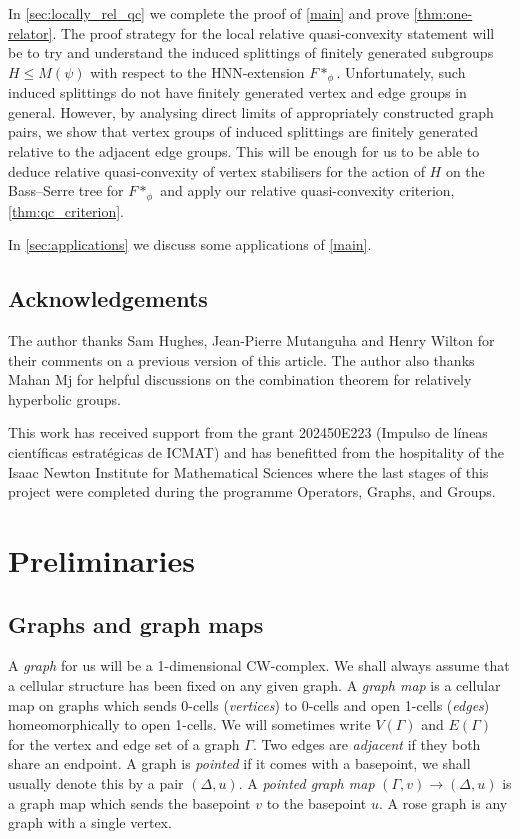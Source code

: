 \documentclass[11pt, a4paper]{amsart}
\theoremstyle{definition}
\begin{document}
In \cref{sec:locally_rel_qc} we complete the proof of \cref{main} and prove \cref{thm:one-relator}. The proof strategy for the local relative quasi-convexity statement will be to try and understand the induced splittings of finitely generated subgroups $H\leqslant M(\psi)$ with respect to the HNN-extension $F*_{\phi}$. Unfortunately, such induced splittings do not have finitely generated vertex and edge groups in general. However, by analysing direct limits of appropriately constructed graph pairs, we show that vertex groups of induced splittings are finitely generated relative to the adjacent edge groups. This will be enough for us to be able to deduce relative quasi-convexity of vertex stabilisers for the action of $H$ on the Bass--Serre tree for $F*_{\phi}$ and apply our relative quasi-convexity criterion, \cref{thm:qc_criterion}.

In \cref{sec:applications} we discuss some applications of \cref{main}.



\subsection*{Acknowledgements}
The author thanks Sam Hughes, Jean-Pierre Mutanguha and Henry Wilton for their comments on a previous version of this article. The author also thanks Mahan Mj for helpful discussions on the combination theorem for relatively hyperbolic groups. 

This work has received support from the grant 202450E223 (Impulso de líneas científicas estratégicas de ICMAT) and has benefitted from the hospitality of the Isaac Newton Institute for Mathematical Sciences where the last stages of this project were completed during the programme Operators, Graphs, and Groups.


\section{Preliminaries}
\label{sec:preliminaries}



\subsection{Graphs and graph maps}

A \emph{graph} for us will be a 1-dimensional CW-complex. We shall always assume that a cellular structure has been fixed on any given graph. A \emph{graph map} is a cellular map on graphs which sends 0-cells (\emph{vertices}) to 0-cells and open 1-cells (\emph{edges}) homeomorphically to open 1-cells. We will sometimes write $V(\Gamma)$ and $E(\Gamma)$ for the vertex and edge set of a graph $\Gamma$. Two edges are \emph{adjacent} if they both share an endpoint. A graph is \emph{pointed} if it comes with a basepoint, we shall usually denote this by a pair $(\Delta, u)$. A \emph{pointed graph map} $(\Gamma, v)\to (\Delta, u)$ is a graph map which sends the basepoint $v$ to the basepoint $u$. A rose graph is any graph with a single vertex. 
\end{document}
